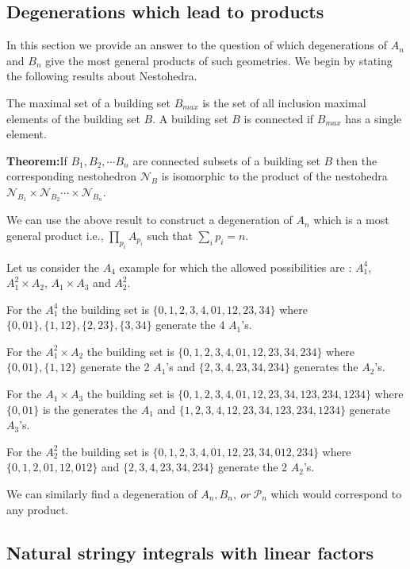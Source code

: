\documentclass[hidelinks,12pt]{article}
\begin{document}
\subsection*{Degenerations which lead to products}
In this section we provide an answer to the question of which degenerations of $A_n$ and $B_n$ give the most general products of such geometries. We begin by stating the following results about Nestohedra.

The maximal set of a building set $B_{max}$ is the set of all inclusion maximal elements of the building set $B$. A building set $B$ is connected if $B_{max}$ has a single element.

{\bf Theorem:}If $B_1, B_2,\cdots B_n$ are connected subsets of a building set $B$ then the corresponding nestohedron ${\mathscr N_B}$ is isomorphic to the product of the nestohedra ${\mathscr N}_{ B_1} \times{\mathscr N}_{ B_2} \cdots \times {\mathscr N}_{B_n}$.

We can use the above result to construct 	a degeneration of $A_n$ which is a most general product i.e., $\prod_{p_i} A_{p_i}$ such that $\sum_{i} p_{i} = n$. 

Let us consider the  $A_4$ example for which the allowed possibilities are : $A_1^{4}$, $A_1^2 \times A_2$, $A_1 \times A_3$ and $A^{2}_2$.
 
For the $A_1^{4}$ the building set is $ \{ {0},{1},{2},{3},{4},{01},{12},{23},{34} \}$ where $\{0,01\} , \{1,12\},\{2,23\},\{3,34\}$ generate the 4 $A_1$'s.

For the $A_1^{2} \times A_2$ the building set is $ \{ {0},{1},{2},{3},{4},{01},{12},{23},{34},{234} \}$ where $\{0,01\} , \{1,12\} $ generate the 2 $A_1$'s and $\{2,3,4,23,34,234\}$ generates the $A_2$'s.

For the $A_1 \times A_3$ the building set is $ \{ {0},{1},{2},{3},{4},{01},{12},{23},{34},{123},{234},{1234} \}$ where $\{0,01\}$ is the generates the $A_1$ and $\{{1},{2},{3},{4},{12},{23},{34},{123},{234},{1234} \}$ generate  $A_3$'s.

For the $A_2^{2}$ the building set is $ \{ {0},{1},{2},{3},{4},{01},{12},{23},{34} ,{012},{234}\}$ where $\{0,1,2,01,12,012\}$  and $\{2,3,4,23,34,234\}$ generate the 2 $A_2$'s.

We can similarly find a degeneration of $A_n,B_n,~or~ {\mathscr P_n}$ which would correspond to any product.


\subsection{Natural stringy integrals with linear factors} 
\end{document}
